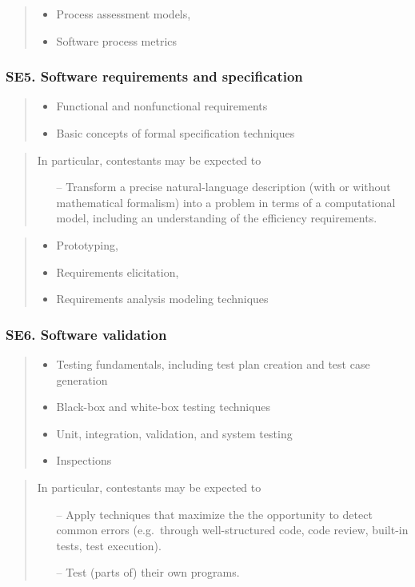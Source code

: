 \documentclass[a4paper,11pt,oneside]{article}
\newcommand{\cmark}{\ding{51}}%
\newcommand{\xmark}{\ding{55}}%
\newcommand{\CC}[1]{#1}
\newcommand{\Ccodeonly}{{\small\cmark\faFileText}}
\newcommand{\Cexcluded}{{\small\xmark}}
\newcommand{\Icodeonly}{\item[\hbox to 1.8em{\Ccodeonly\hfill}]}
\newcommand{\Iexcluded}{\item[\hbox to 1.8em{\Cexcluded\hfill}]}
\newenvironment{myitemize}{\begin{quote}\begin{itemize}\itemsep 0pt}{\end{itemize}\end{quote}}
\begin{document}
        \begin{myitemize}
        \Iexcluded \CC{Process assessment models},
        \Iexcluded \CC{Software process metrics}
        \end{myitemize}

    \subsubsection*{SE5. Software requirements and specification}

        \begin{myitemize}
        \Icodeonly\CC{Functional and nonfunctional requirements}\\
        \Icodeonly\CC{Basic concepts of formal specification techniques}
        \end{myitemize}

        \begin{quote}
        In particular, contestants may be expected to
        \begin{itemize}
        \itemsep -3pt
        \item[--] Transform a precise natural-language description (with or without mathematical formalism) into a problem in terms of a computational model, including an understanding of the efficiency requirements.
        \end{itemize}
        \end{quote}

        \begin{myitemize}
        \Iexcluded \CC{Prototyping},
        \Iexcluded \CC{Requirements elicitation},
        \Iexcluded \CC{Requirements analysis modeling techniques}
        \end{myitemize}

    \subsubsection*{SE6. Software validation}

        \begin{myitemize}
        \Icodeonly\CC{Testing fundamentals, including test plan creation and test case generation}
        \Icodeonly\CC{Black-box and white-box testing techniques}
        \Icodeonly\CC{Unit, integration, validation, and system testing}
        \Icodeonly\CC{Inspections}
        \end{myitemize}

        \begin{quote}
        In particular, contestants may be expected to
        \begin{itemize}
        \itemsep -3pt
        \item[--] Apply techniques that maximize the the opportunity to detect common errors (e.g.\ through well-structured code, code review, built-in tests, test execution).
        \item[--] Test (parts of) their own programs.
        \end{itemize}
        \end{quote}
\end{document}
